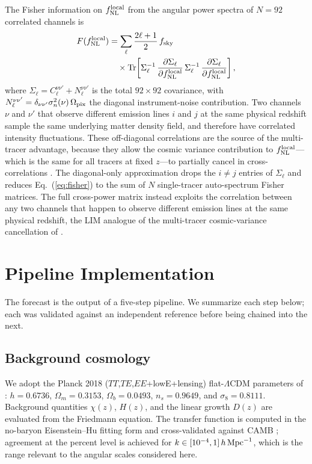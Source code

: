 \documentclass[twocolumn,prd,nofootinbib,superscriptaddress,floatfix,11pt]{revtex4-2}
\begin{document}
The Fisher information on $f_{\rm NL}^{\rm local}$ from the angular power spectra of $N=92$ correlated channels is
\begin{align}
F(f_{\rm NL}^{\rm local}) &= \sum_\ell \frac{2\ell+1}{2}\, f_{\rm sky}\, \nonumber\\
&\quad \times {\rm Tr}\!\left[\Sigma^{-1}_\ell\, \frac{\partial \Sigma_\ell}{\partial f_{\rm NL}^{\rm local}}\, \Sigma^{-1}_\ell\, \frac{\partial \Sigma_\ell}{\partial f_{\rm NL}^{\rm local}}\right],
\label{eq:fisher}
\end{align}
where $\Sigma_\ell = C_\ell^{\nu\nu'} + N_\ell^{\nu\nu'}$ is the total $92\times 92$ covariance, with $N_\ell^{\nu\nu'} = \delta_{\nu\nu'}\sigma_n^2(\nu)\,\Omega_{\rm pix}$ the diagonal instrument-noise contribution.  Two channels $\nu$ and $\nu'$ that observe different emission lines $i$ and $j$ at the same physical redshift sample the same underlying matter density field, and therefore have correlated intensity fluctuations. These off-diagonal correlations are the source of the multi-tracer advantage, because they allow the cosmic variance contribution to $f_{\rm NL}^{\rm local}$---which is the same for all tracers at fixed $z$---to partially cancel in cross-correlations \citep{Seljak2009}.  The diagonal-only approximation drops the $i\ne j$ entries of $\Sigma_\ell$ and reduces Eq.~(\ref{eq:fisher}) to the sum of $N$ single-tracer auto-spectrum Fisher matrices.  The full cross-power matrix instead exploits the correlation between any two channels that happen to observe different emission lines at the same physical redshift, the LIM analogue of the multi-tracer cosmic-variance cancellation of \citet{Seljak2009}.

\section{Pipeline Implementation}
\label{sec:pipeline}
\FloatBarrier

The forecast is the output of a five-step pipeline.  We summarize each step below; each was validated against an independent reference before being chained into the next.

\subsection{Background cosmology}
\label{sec:pipeline:cosmo}

We adopt the Planck 2018 ($TT$,$TE$,$EE$+lowE+lensing) flat-$\Lambda$CDM parameters of \citet{PlanckParams2020}: $h = 0.6736$, $\Omega_m = 0.3153$, $\Omega_b = 0.0493$, $n_s = 0.9649$, and $\sigma_8 = 0.8111$.  Background quantities $\chi(z)$, $H(z)$, and the linear growth $D(z)$ are evaluated from the Friedmann equation.  The transfer function is computed in the no-baryon Eisenstein--Hu fitting form \citep{EisensteinHu1998} and cross-validated against CAMB \citep{LewisChallinor2000}; agreement at the percent level is achieved for $k \in [10^{-4},1]\,h\,{\rm Mpc}^{-1}$, which is the range relevant to the angular scales considered here.
\end{document}
